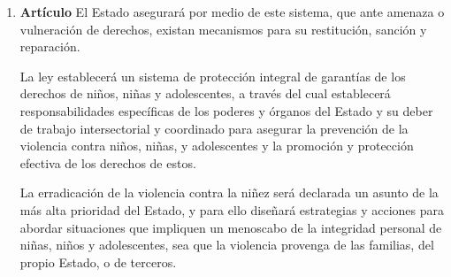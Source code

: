 \documentclass[11pt, a4paper]{article}
\begin{document}
\begin{enumerate}
\item \textbf{Artículo} \newline
El Estado asegurará por medio de este sistema, que ante amenaza o vulneración de derechos, existan mecanismos para su restitución, sanción y reparación. 

La ley establecerá un sistema de protección integral de garantías de los derechos de niños, niñas y adolescentes, a través del cual establecerá responsabilidades específicas de los poderes y órganos del Estado y su deber de trabajo intersectorial y coordinado para asegurar la prevención de la violencia contra niños, niñas, y adolescentes y la promoción y protección efectiva de los derechos de estos. 

La erradicación de la violencia contra la niñez será declarada un asunto de la más alta prioridad del Estado, y para ello diseñará estrategias y acciones para abordar situaciones que impliquen un menoscabo de la integridad personal de niñas, niños y adolescentes, sea que la violencia provenga de las familias, del propio Estado, o de terceros. 


\end{enumerate}
\end{document}
